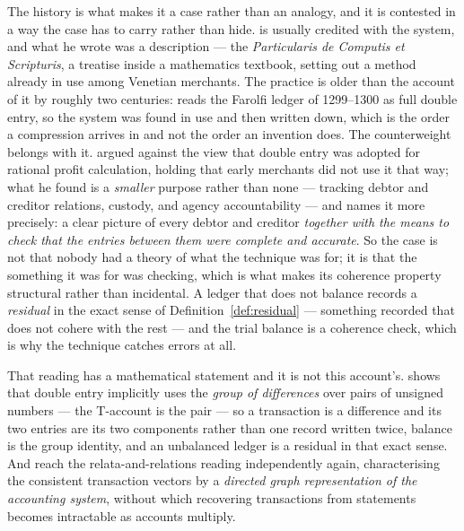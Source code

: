 \documentclass[11pt,a4paper]{article}
\theoremstyle{remark}\newtheorem{remark}[definition]{Remark}
\begin{document}
The history is what makes it a case rather than an analogy, and it is contested in a way the case has
to carry rather than hide. \citet{pacioli1494} is usually credited with the system, and what he wrote
was a description --- the \emph{Particularis de Computis et Scripturis}, a treatise inside a mathematics
textbook, setting out a method already in use among Venetian merchants. The practice is older than the
account of it by roughly two centuries: \citet{lee1977} reads the Farolfi ledger of 1299--1300 as full
double entry, so the system was found in use and then written down, which is the order a compression
arrives in and not the order an invention does. The counterweight belongs with it. \citet{yamey1949}
argued against the view that double entry was adopted for rational profit calculation, holding that
early merchants did not use it that way; what he found is a \emph{smaller} purpose rather than none ---
tracking debtor and creditor relations, custody, and agency accountability --- and \citet{sangster2016}
names it more precisely: a clear picture of every debtor and creditor \emph{together with the means to
check that the entries between them were complete and accurate}. So the case is not that nobody had a
theory of what the technique was for; it is that the something it was for was checking, which is what
makes its coherence property structural rather than incidental. A ledger that does not balance records
a \emph{residual} in the exact sense of Definition~\ref{def:residual} --- something recorded that does
not cohere with the rest --- and the trial balance is a coherence check, which is why the technique
catches errors at all.

That reading has a mathematical statement and it is not this account's. \citet{ellerman1985,ellerman2014}
shows that double entry implicitly uses the \emph{group of differences} over pairs of unsigned numbers
--- the T-account is the pair --- so a transaction is a difference and its two entries are its two
components rather than one record written twice, balance is the group identity, and an unbalanced ledger
is a residual in that exact sense. And \citet{aryagraph2000} reach the relata-and-relations reading
independently again, characterising the consistent transaction vectors by a \emph{directed graph
representation of the accounting system}, without which recovering transactions from statements
\citep{arya2000} becomes intractable as accounts multiply.
\end{document}
